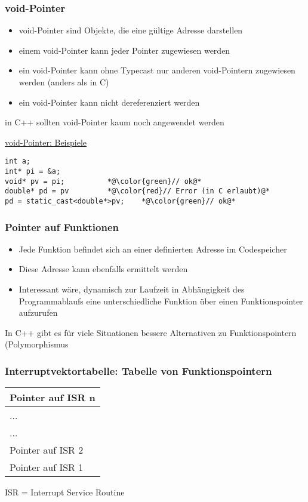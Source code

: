 \subsubsection{void-Pointer\hfill}
\label{sec:unterunterabschnitt}
\begin{itemize}
	\item void-Pointer sind Objekte, die eine gültige Adresse darstellen
	\item einem void-Pointer kann jeder Pointer zugewiesen werden
	\item \Large{ein void-Pointer kann ohne Typecast nur anderen void-Pointern zugewiesen werden (anders als in C)}\normalsize
	\item ein void-Pointer kann nicht dereferenziert werden
\end{itemize}
\begin{hinweis}
in C++ sollten void-Pointer kaum noch angewendet werden
\end{hinweis}
\underline{void-Pointer: Beispiele}\\
\noindent
\begin{minipage}{\linewidth}
\begin{lstlisting}
int a;
int* pi = &a;
void* pv = pi;			*@\color{green}// ok@*
double* pd = pv			*@\color{red}// Error (in C erlaubt)@*
pd = static_cast<double*>pv;	*@\color{green}// ok@*
\end{lstlisting}
\end{minipage}

\subsubsection{Pointer auf Funktionen\hfill}
\label{sec:unterunterabschnitt}
\begin{itemize}
	\item Jede Funktion befindet sich an einer definierten Adresse im Codespeicher
	\item Diese Adresse kann ebenfalls ermittelt werden
	\item Interessant wäre, dynamisch zur Laufzeit in Abhängigkeit des Programmablaufs eine unterschiedliche Funktion über einen Funktionspointer aufzurufen
\end{itemize}
\begin{hinweis}
In C++ gibt es für viele Situationen bessere Alternativen zu Funktionspointern (Polymorphismus
\end{hinweis}

\subsubsection{Interruptvektortabelle: Tabelle von Funktionspointern\hfill}
\label{sec:unterunterabschnitt}
\centering
\begin{tabularx}{0.25\textwidth}{|X|}
	\hline
	Pointer auf ISR n\\
	\hline
	...\\
	\hline
	...\\
	\hline
	Pointer auf ISR 2\\
	\hline
	Pointer auf ISR 1\\
	\hline
\end{tabularx}
\flushleft
ISR = Interrupt Service Routine

